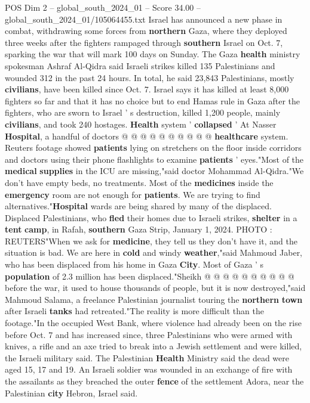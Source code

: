 \begin{textsample}{POS Dim 2 – global\_south\_2024\_01 – Score 34.00 – global\_south\_2024\_01/105064455.txt}
Israel has announced a new phase in combat, withdrawing some forces from \textbf{northern} Gaza, where they deployed three weeks after the fighters rampaged through \textbf{southern} Israel on Oct. 7, sparking the war that will mark 100 days on Sunday.
The Gaza \textbf{health} ministry spokesman Ashraf Al-Qidra said Israeli strikes killed 135 Palestinians and wounded 312 in the past 24 hours.
In total, he said 23,843 Palestinians, mostly \textbf{civilians}, have been killed since Oct. 7.
Israel says it has killed at least 8,000 fighters so far and that it has no choice but to end Hamas rule in Gaza after the fighters, who are sworn to Israel ' s destruction, killed 1,200 people, mainly \textbf{civilians}, and took 240 hostages. \textbf{Health} system ' \textbf{collapsed} ' At Nasser \textbf{Hospital}, a handful of doctors @ @ @ @ @ @ @ @ @ @ \textbf{healthcare} system.
Reuters footage showed \textbf{patients} lying on stretchers on the floor inside corridors and doctors using their phone flashlights to examine \textbf{patients} ' eyes."Most of the \textbf{medical} \textbf{supplies} in the ICU are missing,"said doctor Mohammad Al-Qidra."We don't have empty beds, no treatments.
Most of the \textbf{medicines} inside the \textbf{emergency} room are not enough for \textbf{patients}.
We are trying to find alternatives."\textbf{Hospital} wards are being shared by many of the displaced.
Displaced Palestinians, who \textbf{fled} their homes due to Israeli strikes, \textbf{shelter} in a \textbf{tent} \textbf{camp}, in Rafah, \textbf{southern} Gaza Strip, January 1, 2024.
PHOTO : REUTERS"When we ask for \textbf{medicine}, they tell us they don't have it, and the situation is bad.
We are here in \textbf{cold} and windy \textbf{weather},"said Mahmoud Jaber, who has been displaced from his home in Gaza \textbf{City}.
Most of Gaza ' s \textbf{population} of 2.3 million has been displaced."Sheikh @ @ @ @ @ @ @ @ @ @ before the war, it used to house thousands of people, but it is now destroyed,"said Mahmoud Salama, a freelance Palestinian journalist touring the \textbf{northern} \textbf{town} after Israeli \textbf{tanks} had retreated."The reality is more difficult than the footage."In the occupied West Bank, where violence had already been on the rise before Oct. 7 and has increased since, three Palestinians who were armed with knives, a rifle and an axe tried to break into a Jewish settlement and were killed, the Israeli military said.
The Palestinian \textbf{Health} Ministry said the dead were aged 15, 17 and 19.
An Israeli soldier was wounded in an exchange of fire with the assailants as they breached the outer \textbf{fence} of the settlement Adora, near the Palestinian \textbf{city} Hebron, Israel said.

\end{textsample}
